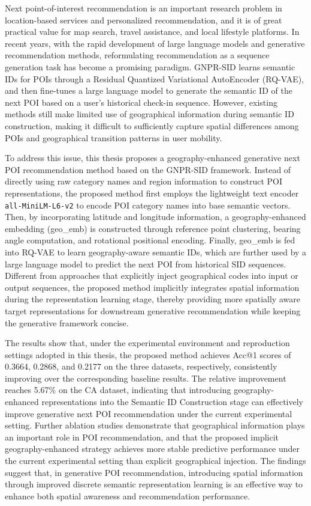 \begin{abstract*}
Next point-of-interest recommendation is an important research problem in location-based services and personalized recommendation, and it is of great practical value for map search, travel assistance, and local lifestyle platforms. In recent years, with the rapid development of large language models and generative recommendation methods, reformulating recommendation as a sequence generation task has become a promising paradigm. GNPR-SID learns semantic IDs for POIs through a Residual Quantized Variational AutoEncoder (RQ-VAE), and then fine-tunes a large language model to generate the semantic ID of the next POI based on a user’s historical check-in sequence. However, existing methods still make limited use of geographical information during semantic ID construction, making it difficult to sufficiently capture spatial differences among POIs and geographical transition patterns in user mobility.

To address this issue, this thesis proposes a geography-enhanced generative next POI recommendation method based on the GNPR-SID framework. Instead of directly using raw category names and region information to construct POI representations, the proposed method first employs the lightweight text encoder \texttt{all-MiniLM-L6-v2} to encode POI category names into base semantic vectors. Then, by incorporating latitude and longitude information, a geography-enhanced embedding (geo\_emb) is constructed through reference point clustering, bearing angle computation, and rotational positional encoding. Finally, geo\_emb is fed into RQ-VAE to learn geography-aware semantic IDs, which are further used by a large language model to predict the next POI from historical SID sequences. Different from approaches that explicitly inject geographical codes into input or output sequences, the proposed method implicitly integrates spatial information during the representation learning stage, thereby providing more spatially aware target representations for downstream generative recommendation while keeping the generative framework concise.

The results show that, under the experimental environment and reproduction settings adopted in this thesis, the proposed method achieves Acc@1 scores of 0.3664, 0.2868, and 0.2177 on the three datasets, respectively, consistently improving over the corresponding baseline results. The relative improvement reaches 5.67\% on the CA dataset, indicating that introducing geography-enhanced representations into the Semantic ID Construction stage can effectively improve generative next POI recommendation under the current experimental setting.
Further ablation studies demonstrate that geographical information plays an important role in POI recommendation, and that the proposed implicit geography-enhanced strategy achieves more stable predictive performance under the current experimental setting than explicit geographical injection. The findings suggest that, in generative POI recommendation, introducing spatial information through improved discrete semantic representation learning is an effective way to enhance both spatial awareness and recommendation performance.

\end{abstract*}